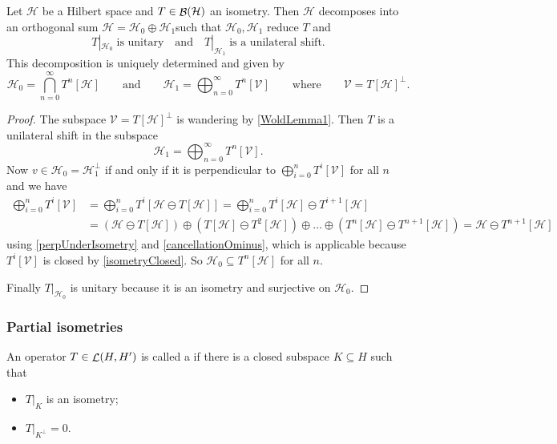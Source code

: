 \begin{theorem}
Let $\mathcal{H}$ be a Hilbert space and $T\in\mathop{\mathcal{B}}(\mathcal{H})$ an isometry. Then $\mathcal{H}$ decomposes into an orthogonal sum $\mathcal{H} = \mathcal{H}_0\oplus \mathcal{H}_1$such that $\mathcal{H}_0, \mathcal{H}_1$ reduce $T$ and
\[ T|_{\mathcal{H}_0}\;\text{is unitary} \quad\text{and}\quad T|_{\mathcal{H}_1}\;\text{is a unilateral shift}. \]
This decomposition is uniquely determined and given by
\[ \mathcal{H}_0 = \bigcap_{n=0}^\infty T^n[\mathcal{H}] \qquad\text{and}\qquad \mathcal{H}_1 = \bigoplus_{n=0}^\infty T^n[\mathcal{V}] \qquad\text{where}\qquad \mathcal{V} = T[\mathcal{H}]^\perp. \]
\end{theorem}
\begin{proof}
The subspace $\mathcal{V} = T[\mathcal{H}]^\perp$ is wandering by \ref{WoldLemma1}. Then $T$ is a unilateral shift in the subspace
\[ \mathcal{H}_1 = \bigoplus_{n=0}^\infty T^n[\mathcal{V}]. \]
Now $v\in\mathcal{H}_0 = \mathcal{H}_1^\perp$ if and only if it is perpendicular to $\bigoplus_{i=0}^n T^i[\mathcal{V}]$ for all $n$ and we have
\begin{align*}
\bigoplus_{i=0}^n T^i[\mathcal{V}] &= \bigoplus_{i=0}^n T^i[\mathcal{H}\ominus T[\mathcal{H}]] = \bigoplus_{i=0}^n T^i[\mathcal{H}]\ominus T^{i+1}[\mathcal{H}] \\
&= (\mathcal{H}\ominus T[\mathcal{H}])\oplus(T[\mathcal{H}]\ominus T^2[\mathcal{H}])\oplus \ldots \oplus (T^n[\mathcal{H}]\ominus T^{n+1}[\mathcal{H}])  = \mathcal{H} \ominus T^{n+1}[\mathcal{H}] 
\end{align*}
using \ref{perpUnderIsometry} and \ref{cancellationOminus}, which is applicable because $T^i[\mathcal{V}]$ is closed by \ref{isometryClosed}. So $\mathcal{H}_0\subseteq T^n[\mathcal{H}]$ for all $n$.

Finally $T|_{\mathcal{H}_0}$ is unitary because it is an isometry and surjective on $\mathcal{H}_0$.
\end{proof}

\subsubsection{Partial isometries}
\begin{definition}
An operator $T\in \mathop{\mathcal{L}}(H, H')$ is called a  if there is a closed subspace $K\subseteq H$ such that
\begin{itemize}
\item $T|_K$ is an isometry;
\item $T|_{K^\perp} = 0$.
\end{itemize}
\end{definition}

